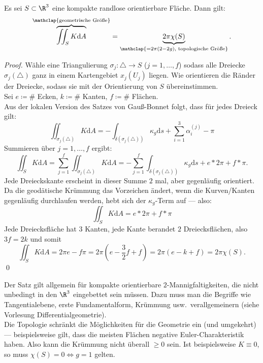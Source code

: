 \begin{theorem}
  Es sei \( S \subset \R^3 \) eine kompakte randlose orientierbare Fläche. Dann gilt:
  \begin{equation*}
    \overbrace{\iint_S K\text{d}A}^{\mathclap{\text{geometrische Größe}}} = \underbrace{2\pi\chi(S)}_{\mathclap{=2\pi(2-2g)\text{, topologische Größe}}}\text{.}
  \end{equation*}
  \begin{proof}
    Wähle eine Triangulierung \( \sigma_j: \triangle \to S \) (\( j = 1,\dots,f \)) sodass alle Dreiecke \( \sigma_j(\triangle) \) ganz in einem Kartengebiet \( x_j(U_j) \) liegen. Wie orientieren die Ränder der Dreiecke, sodass sie mit der Orientierung von \( S \) übereinstimmen. \\
    Sei \( e \coloneqq \# \) Ecken, \( k \coloneqq \# \) Kanten, \( f \coloneqq \# \) Flächen. \\
    Aus der lokalen Version des Satzes von Gauß-Bonnet folgt, dass für jedes Dreieck gilt:
    \begin{equation*}
      \iint_{\sigma_j(\triangle)}K\text{d}A = -\int_{\delta(\sigma_j(\triangle))}\kappa_g\text{d}s + \sum_{i = 1}^3 \alpha_i^{(j)} - \pi
    \end{equation*}
    Summieren über \( j = 1,\dots,f \) ergibt:
    \begin{equation*}
      \iint_S K\text{d}A = \sum_{j=1}^f\iint_{\sigma_j(\triangle)}K\text{d}A = -\sum_{j=1}^f\int_{\delta(\sigma_j(\triangle))}\kappa_g\text{d}s + e*2\pi + f*\pi \text{.}
    \end{equation*}
    Jede Dreieckskante erscheint in dieser Summe \( 2 \) mal, aber gegenläufig orientiert. Da die geodätische Krümmung das Vorzeichen ändert, wenn die Kurven/Kanten gegenläufig durchlaufen werden, hebt sich der \( \kappa_g \)-Term auf --- also:
    \begin{equation*}
      \iint_S K\text{d}A = e*2\pi + f*\pi
    \end{equation*}
    Jede Dreiecksfläche hat \( 3 \) Kanten, jede Kante berandet \( 2 \) Dreiecksflächen, also \( 3f = 2k \) und somit
    \begin{equation*}
      \iint_S K\text{d}A = 2\pi e - f\pi = 2\pi(e - \frac{3}{2}f + f) = 2\pi(e-k+f) = 2\pi\chi(S)\text{.}
    \end{equation*} \qed{}
  \end{proof}
\end{theorem}

\begin{remark}
  Der Satz gilt allgemein für kompakte orientierbare \( 2 \)-Mannigfaltigkeiten, die nicht unbedingt in den \( \R^3 \) eingebettet sein müssen. Dazu muss man die Begriffe wie Tangentialebene, erste Fundamentalform, Krümmung usw.\ verallgemeinern (siehe Vorlesung Differentialgeometrie). \\
  Die Topologie schränkt die Möglichkeiten für die Geometrie ein (und umgekehrt) --- beispielsweise gilt, dass die meisten Flächen negative Euler-Charakteristik haben. Also kann die Krümmung nicht überall \( \geq 0 \) sein. Ist beispielsweise \( K \equiv 0 \), so muss \( \chi(S) = 0 \Leftrightarrow g = 1 \) gelten.
\end{remark}

